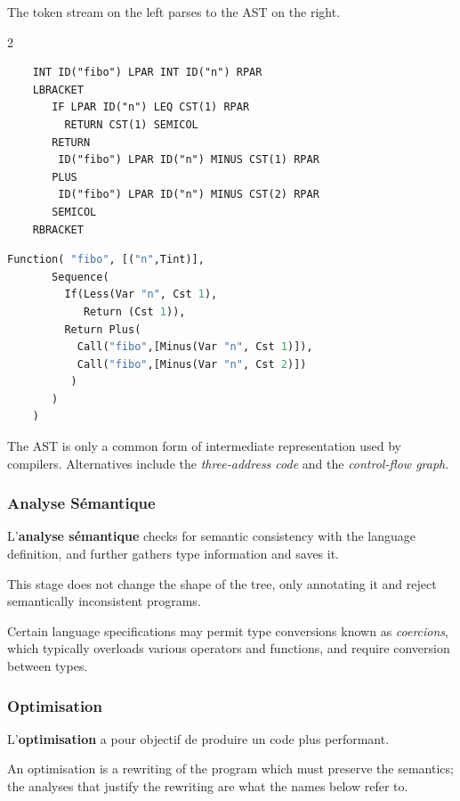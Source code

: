 \begin{example}
  The token stream on the left parses to the AST on the right.
  \begin{multicols}{2}
    \begin{lstlisting}
    INT ID("fibo") LPAR INT ID("n") RPAR
    LBRACKET
       IF LPAR ID("n") LEQ CST(1) RPAR
         RETURN CST(1) SEMICOL
       RETURN
        ID("fibo") LPAR ID("n") MINUS CST(1) RPAR
       PLUS
        ID("fibo") LPAR ID("n") MINUS CST(2) RPAR
       SEMICOL
    RBRACKET
    \end{lstlisting}
    \vfill\null
    \begin{lstlisting}[language=Caml]
    Function( "fibo", [("n",Tint)],
       Sequence(
         If(Less(Var "n", Cst 1),
            Return (Cst 1)),
         Return Plus(
           Call("fibo",[Minus(Var "n", Cst 1)]),
           Call("fibo",[Minus(Var "n", Cst 2)])
          )
       )
    )
    \end{lstlisting}
  \end{multicols}
\end{example}
\begin{remark}
  The AST is only a common form of intermediate representation used by
  compilers. Alternatives include the \textit{three-address code} and the
  \textit{control-flow graph}.
\end{remark}

\subsubsection{Analyse Sémantique}
\begin{definition}
  L'\textbf{analyse sémantique} checks for semantic consistency with the
  language definition, and further gathers type information and saves it.
\end{definition}
This stage does not change the shape of the tree, only annotating it and
reject semantically inconsistent programs.
\begin{remark}
  Certain language specifications may permit type conversions known as
  \textit{coercions}, which typically overloads various operators and
  functions, and require conversion between types.
\end{remark}

\subsubsection{Optimisation}
\begin{definition}[Optimisation]
  L'\textbf{optimisation} a pour objectif de produire un code plus performant.
\end{definition}
An optimisation is a rewriting of the program which must preserve the
semantics; the analyses that justify the rewriting are what the names below
refer to.


